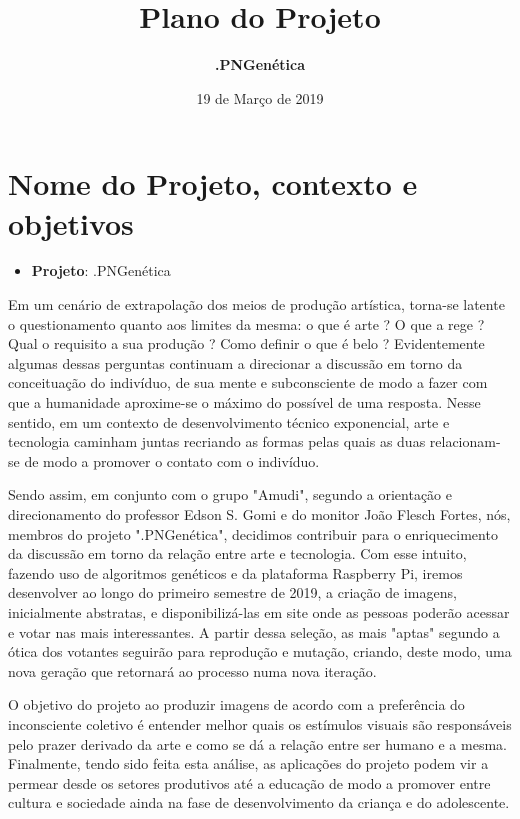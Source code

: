 \documentclass{article}
\title{\textbf{Plano do Projeto}}
\author{\textbf{.PNGenética}}
\date{19 de Março de 2019}
\begin{document}
	
	\maketitle
	
	\section{Nome do Projeto, contexto e objetivos}
	\begin{itemize}
		\item {\textbf{Projeto}}: .PNGenética \newline
	\end{itemize}
	
	Em um cenário de extrapolação dos meios de produção artística, torna-se latente o questionamento quanto aos limites da mesma: o que é arte ? O que a rege ? Qual o requisito a sua produção ? Como definir o que é belo ? Evidentemente algumas dessas perguntas continuam a direcionar a discussão em torno da conceituação do indivíduo, de sua mente e subconsciente de modo a fazer com que a humanidade aproxime-se o máximo do possível de uma resposta. Nesse sentido, em um contexto de desenvolvimento técnico exponencial, arte e tecnologia caminham juntas recriando as formas pelas quais as duas relacionam-se de modo a promover o contato com o indivíduo. \newline
	
	Sendo assim, em conjunto com o grupo "Amudi", segundo a orientação e direcionamento do professor Edson S. Gomi e do monitor João Flesch Fortes, nós, membros do projeto ".PNGenética", decidimos contribuir para o enriquecimento da discussão em torno da relação entre arte e tecnologia. Com esse intuito, fazendo uso de algoritmos genéticos e da plataforma Raspberry Pi, iremos desenvolver ao longo do primeiro semestre de 2019, a criação de imagens, inicialmente abstratas, e disponibilizá-las em site onde as pessoas poderão acessar e votar nas mais interessantes. A partir dessa seleção, as mais "aptas" segundo a ótica dos votantes seguirão para reprodução e mutação, criando, deste modo, uma nova geração que retornará ao processo numa nova iteração.\newline

	O objetivo do projeto ao produzir imagens de acordo com a preferência do inconsciente coletivo é entender melhor quais os estímulos visuais são responsáveis pelo prazer derivado da arte e como se dá a relação entre ser humano e a mesma. Finalmente, tendo sido feita esta análise, as aplicações do projeto podem vir a permear desde os setores produtivos até a educação de modo a promover entre cultura e sociedade ainda na fase de desenvolvimento da criança e do adolescente. 
	
\end{document}
